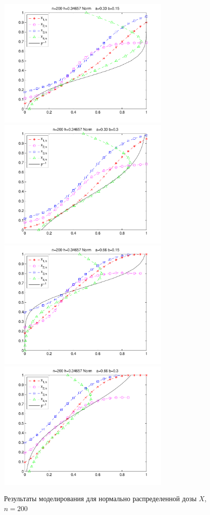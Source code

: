 \documentclass[a4paper,14pt,russian]{article}
\begin{document}
\begin{figure}[p]
\center
\caption{Результаты моделирования для нормально распределенной дозы $X$, $n=200$}
\includegraphics[width = 240pt,height = 180pt]{7n.pdf}
\includegraphics[width = 240pt,height = 180pt]{8n.pdf}
\includegraphics[width = 240pt,height = 180pt]{9n.pdf}
\includegraphics[width = 240pt,height = 180pt]{10n.pdf}

\end{figure}
\end{document}
